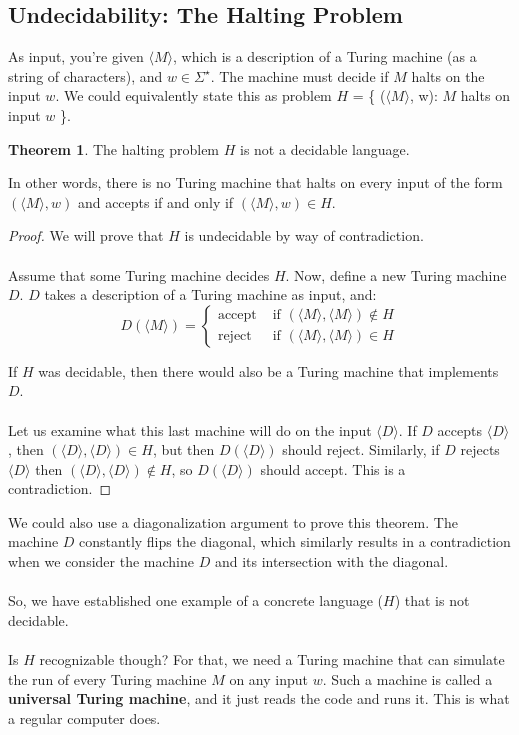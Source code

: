 \documentclass[]{article}
\theoremstyle{definition}
\newtheorem*{theorem}{Theorem}
\begin{document}
  \subsection{Undecidability: The Halting Problem}
    As input, you're given $\langle M \rangle$, which is a description of a Turing machine (as a string of characters), and $w \in \Sigma^\star$. The machine must decide if $M$ halts on the input $w$. We could equivalently state this as problem $H$ = \{ ($\langle M \rangle$, w): $M$ halts on input $w$ \}.

    \begin{theorem}
      The halting problem $H$ is not a decidable language.
    \end{theorem}

    In other words, there is no Turing machine that halts on every input of the form $(\langle M \rangle, w)$ and accepts if and only if $(\langle M \rangle, w) \in H$.

     \begin{proof}
      We will prove that $H$ is undecidable by way of contradiction.
      \\ \\
      Assume that some Turing machine decides $H$. Now, define a new Turing machine $D$. $D$ takes a description of a Turing machine as input, and:
      $$
        D(\langle M \rangle) = \begin{cases}
          \text{accept } & \text{if } (\langle M \rangle, \langle M \rangle) \not \in H \\
          \text{reject } & \text{if } (\langle M \rangle, \langle M \rangle) \in H
        \end{cases}
      $$

      If $H$ was decidable, then there would also be a Turing machine that implements $D$.
      \\ \\
      Let us examine what this last machine will do on the input $\langle D \rangle$. If $D$ accepts $\langle D \rangle$, then $(\langle D \rangle, \langle D \rangle) \in H$, but then $D(\langle D \rangle)$ should reject. Similarly, if $D$ rejects $\langle D \rangle$ then $(\langle D \rangle, \langle D \rangle) \not \in H$, so $D(\langle D \rangle)$ should accept. This is a contradiction.
    \end{proof}

    We could also use a diagonalization argument to prove this theorem. The machine $D$ constantly flips the diagonal, which similarly results in a contradiction when we consider the machine $D$ and its intersection with the diagonal.
    \\ \\
    So, we have established one example of a concrete language ($H$) that is not decidable.
    \\ \\
    Is $H$ recognizable though? For that, we need a Turing machine that can simulate the run of every Turing machine $M$ on any input $w$. Such a machine is called a \textbf{universal Turing machine}, and it just reads the code and runs it. This is what a regular computer does.
\end{document}
